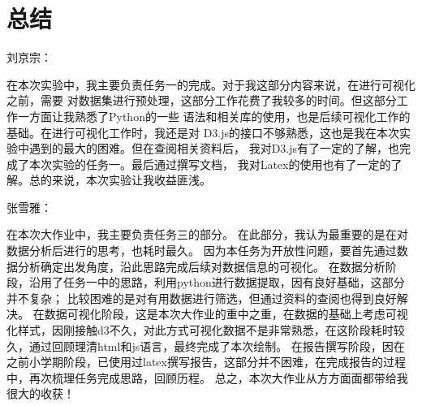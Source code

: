 \documentclass[a4paper]{article}
\begin{document}
\section{总结}
刘京宗：

在本次实验中，我主要负责任务一的完成。对于我这部分内容来说，在进行可视化之前，需要
对数据集进行预处理，这部分工作花费了我较多的时间。但这部分工作一方面让我熟悉了Python的一些
语法和相关库的使用，也是后续可视化工作的基础。在进行可视化工作时，我还是对
D3.js的接口不够熟悉，这也是我在本次实验中遇到的最大的困难。但在查阅相关资料后，
我对D3.js有了一定的了解，也完成了本次实验的任务一。最后通过撰写文档，
我对Latex的使用也有了一定的了解。总的来说，本次实验让我收益匪浅。

张雪雅：

在本次大作业中，我主要负责任务三的部分。
在此部分，我认为最重要的是在对数据分析后进行的思考，也耗时最久。
因为本任务为开放性问题，要首先通过数据分析确定出发角度，沿此思路完成后续对数据信息的可视化。
在数据分析阶段，沿用了任务一中的思路，利用python进行数据提取，因有良好基础，这部分并不复杂；
比较困难的是对有用数据进行筛选，但通过资料的查阅也得到良好解决。
在数据可视化阶段，这是本次大作业的重中之重，在数据的基础上考虑可视化样式，因刚接触d3不久，对此方式可视化数据不是非常熟悉，在这阶段耗时较久，通过回顾理清html和js语言，最终完成了本次绘制。
在报告撰写阶段，因在之前小学期阶段，已使用过latex撰写报告，这部分并不困难，在完成报告的过程中，再次梳理任务完成思路，回顾历程。
总之，本次大作业从方方面面都带给我很大的收获！ 


\end{document}
